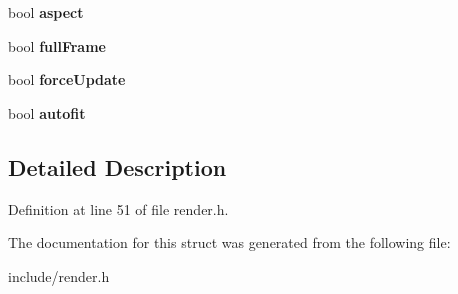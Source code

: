 \begin{DoxyCompactItemize}
\item 
\hypertarget{structRender__t_a99607d2cd5b64eb4d57049aa55f84424}{bool {\bfseries aspect}}\label{structRender__t_a99607d2cd5b64eb4d57049aa55f84424}

\item 
\hypertarget{structRender__t_af06a3a37584a24e9a95379755d8a30b9}{bool {\bfseries full\-Frame}}\label{structRender__t_af06a3a37584a24e9a95379755d8a30b9}

\item 
\hypertarget{structRender__t_ac75e0229bc44b396f7149a1543f0da64}{bool {\bfseries force\-Update}}\label{structRender__t_ac75e0229bc44b396f7149a1543f0da64}

\item 
\hypertarget{structRender__t_a2f43bddf2516241377aead39566d0f5f}{bool {\bfseries autofit}}\label{structRender__t_a2f43bddf2516241377aead39566d0f5f}

\end{DoxyCompactItemize}


\subsection{Detailed Description}


Definition at line 51 of file render.\-h.



The documentation for this struct was generated from the following file\-:\begin{DoxyCompactItemize}
\item 
include/render.\-h\end{DoxyCompactItemize}
